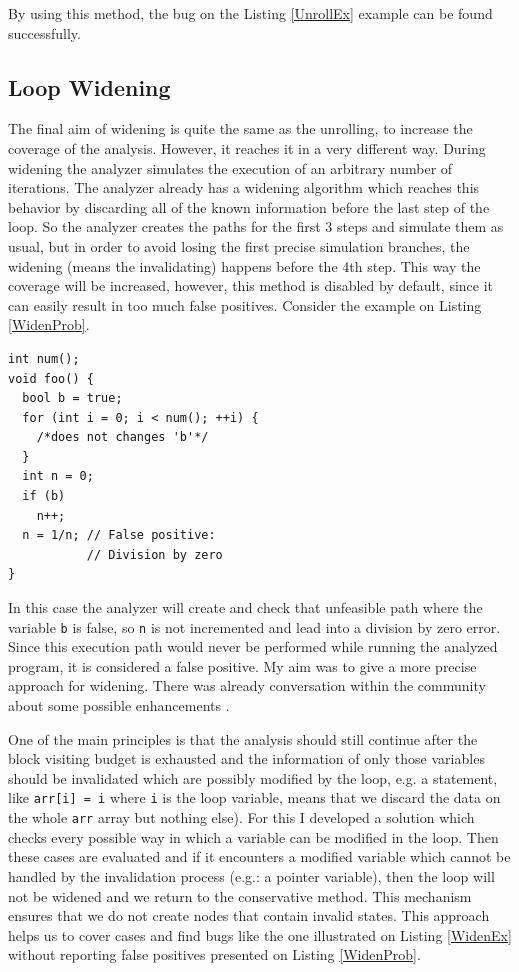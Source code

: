\documentclass[oneside, a4paper, 12pt]{article}
\theoremstyle{definition}
\begin{document}
By using this method, the bug on the Listing \ref{UnrollEx} example can be 
found successfully.

\subsection{Loop Widening}
The final aim of widening is quite the same as the unrolling, to increase 
the coverage of the analysis. However, it reaches it in a very different way. 
During widening the analyzer simulates the execution of an arbitrary number 
of iterations. The analyzer already has a widening algorithm which reaches 
this behavior by discarding all of the known information before the last step 
of the loop. So the analyzer creates the paths for the first 3 steps and 
simulate them as usual, but in order to avoid losing the first precise simulation branches, the widening (means the invalidating) happens 
before the 4th step. 
This way the coverage will be increased, however, this method is disabled by 
default, since it can easily result in too much false positives. Consider the 
example on Listing \ref{WidenProb}.
\\

\begin{lstlisting}
int num();
void foo() {
  bool b = true;
  for (int i = 0; i < num(); ++i) {
    /*does not changes 'b'*/
  }
  int n = 0;
  if (b)
    n++;
  n = 1/n; // False positive:
           // Division by zero
}\end{lstlisting}
In this case the analyzer will create and check that unfeasible path where 
the variable \texttt{b} is false, so \texttt{n} is not incremented and lead 
into a division by zero error. Since this execution path would never be 
performed while running the analyzed program, it is considered a false positive. My aim 
was to give a more precise approach for widening. There was already conversation within the community about some possible enhancements \cite{Widening}.

One of the main principles is that the analysis should still continue after the block 
visiting budget is exhausted and the information of only those variables should be invalidated which are possibly modified by the loop, e.g. a statement, like \texttt{arr[i] = i} where \texttt{i} is the loop variable, means that we discard the data on the whole \texttt{arr} array but nothing else).
For this I developed a solution which checks every possible way in which a 
variable can be modified in the loop. Then these cases are evaluated and if it 
encounters a modified variable which cannot be handled by the invalidation 
process (e.g.: a pointer variable), then the loop will not be widened and we
return to the conservative method. This mechanism ensures that we do not create 
nodes that contain invalid states.
This approach helps us to cover cases and find bugs like the one illustrated on 
Listing \ref{WidenEx} without reporting false positives  
presented on Listing \ref{WidenProb}.
\end{document}
